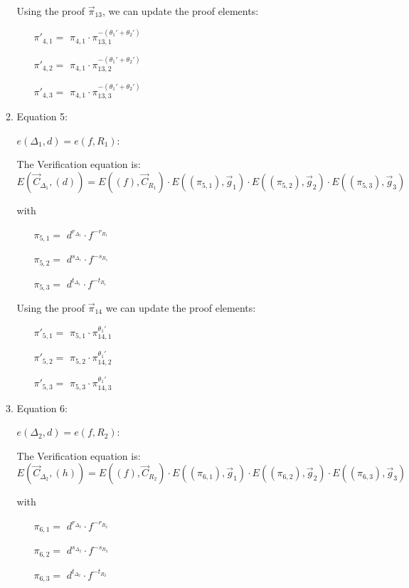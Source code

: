 \begin{description}
\begin{enumerate}
\begin{enumerate}
      Using the proof $\vec{\pi}_{13}$, we can update the proof elements:

      \begin{itemize}
      \item[$\pi'_{4,1} = $] $\pi_{4,1} \cdot \pi_{13,1}^{-(\theta_1' + \theta_2')}$
      \item[$\pi'_{4,2} = $] $\pi_{4,1} \cdot \pi_{13,2}^{-(\theta_1' + \theta_2')}$
      \item[$\pi'_{4,3} = $] $\pi_{4,1} \cdot \pi_{13,3}^{-(\theta_1' + \theta_2')}$
      \end{itemize}

    \item Equation 5:

      $e(\boxed{\Delta_1},d) = e(f, \boxed{R_1})$:
      
      The Verification equation is:  $E(\vec{C}_{\Delta_1}, (d)) = E((f), \vec{C}_{R_1}) \cdot E((\pi_{5,1}), \vec{g}_1)\cdot E((\pi_{5,2}), \vec{g}_2)\cdot E((\pi_{5,3}), \vec{g}_3)$
      
      with
      \begin{itemize}
      \item[$\pi_{5,1} = $] $d^{r_{\Delta_1}} \cdot f^{-r_{R_1}}$
      \item[$\pi_{5,2} = $] $d^{s_{\Delta_1}} \cdot f^{-s_{R_1}}$
      \item[$\pi_{5,3} = $] $d^{t_{\Delta_1}} \cdot f^{-t_{R_1}}$
      \end{itemize}

      Using the proof $\vec{\pi}_{14}$ we can update the proof elements:
      \begin{itemize}
      \item[$\pi'_{5,1} = $] $\pi_{5,1} \cdot \pi_{14,1}^{\theta_1'}$
      \item[$\pi'_{5,2} = $] $\pi_{5,2} \cdot \pi_{14,2}^{\theta_1'}$
      \item[$\pi'_{5,3} = $] $\pi_{5,3} \cdot \pi_{14,3}^{\theta_1'}$
      \end{itemize}

    \item Equation 6:

      $e(\boxed{\Delta_2},d) = e(f, \boxed{R_2})$:

      The Verification equation is:  $E(\vec{C}_{\Delta_2}, (h)) = E((f), \vec{C}_{R_2}) \cdot E((\pi_{6,1}), \vec{g}_1)\cdot E((\pi_{6,2}), \vec{g}_2)\cdot E((\pi_{6,3}), \vec{g}_3)$

      with
      \begin{itemize}
      \item[$\pi_{6,1} = $] $d^{r_{\Delta_2}} \cdot f^{-r_{R_2}}$
      \item[$\pi_{6,2} = $] $d^{s_{\Delta_2}} \cdot f^{-s_{R_2}}$
      \item[$\pi_{6,3} = $] $d^{t_{\Delta_2}} \cdot f^{-t_{R_2}}$
      \end{itemize}


\end{enumerate}
\end{enumerate}
\end{description}

